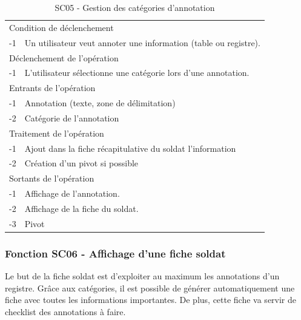 \documentclass[a4paper]{article}
\begin{document}
\begin{table}[H]
  \centering
   \small
	\begin{tabular}{|c|p{12cm}|}
   		\hline
   			\rowcolor{lightgray}\multicolumn{2}{|c|}{\textbf{SC05 - Gestion des cat\'egories d'annotation}} \\
   		\hline
   			\multicolumn{2}{|l|}{Condition de d\'eclenchement} \\
   		\hline
   		-1 & Un utilisateur veut annoter une information (table ou registre). \\
   		\hline
   			\multicolumn{2}{|l|}{D\'eclenchement de l'op\'eration} \\
   		\hline
   			-1 & L'utilisateur s\'electionne une cat\'egorie lors d'une annotation. \\
   		\hline
   			\multicolumn{2}{|l|}{Entrants de l'op\'eration} \\
   		\hline
   			-1 & Annotation (texte, zone de d\'elimitation)\\
        	-2 & Cat\'egorie de l'annotation \\
   		\hline
   			\multicolumn{2}{|l|}{Traitement de l'op\'eration} \\
  		\hline
   			-1 & Ajout dans la fiche r\'ecapitulative du soldat l'information \\
        	-2 & Cr\'eation d'un pivot si possible \\
   		\hline
   			\multicolumn{2}{|l|}{Sortants de l'op\'eration} \\
   		\hline
   			-1 & Affichage de l'annotation. \\
            -2 & Affichage de la fiche du soldat. \\
            -3 & Pivot \\
   		\hline
	\end{tabular}
  \caption{SC05 - Gestion des cat\'egories d'annotation}
  \normalsize
  \label{tab:gestion_categorie}
\end{table}




\subsubsection{Fonction SC06 - Affichage d'une fiche soldat}

Le but de la fiche soldat est d'exploiter au maximum les annotations d'un registre. Gr\^ace aux cat\'egories, il est possible de g\'en\'erer automatiquement une fiche avec toutes les informations importantes. De plus, cette fiche va servir de checklist des annotations \`a faire.\\
\end{document}
